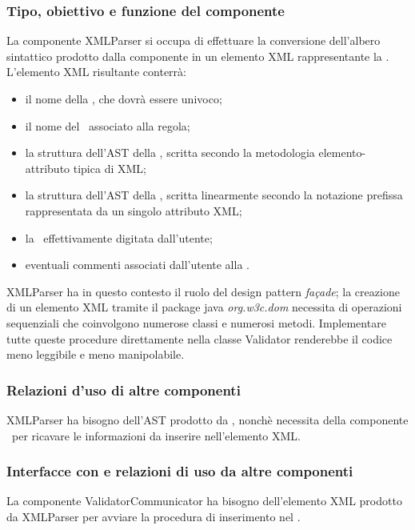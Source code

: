 \documentclass[11pt,titlepage,a4paper]{report}
\begin{document}
\subsubsection{Tipo, obiettivo e funzione del componente}
La componente XMLParser si occupa di effettuare la conversione dell'albero sintattico prodotto dalla componente \brp in un elemento XML rappresentante la \br. L'elemento XML risultante conterr\`a:
\begin{itemize}
 \item il nome della \br, che dovr\`a essere univoco;
 \item il nome del \bo\ associato alla regola;
 \item la struttura dell'AST della \br, scritta secondo la metodologia elemento-attributo tipica di XML;
 \item la struttura dell'AST della \br, scritta linearmente secondo la notazione prefissa rappresentata da un singolo attributo XML;
 \item la \br\ effettivamente digitata dall'utente;
 \item eventuali commenti associati dall'utente alla \br.
\end{itemize}
XMLParser ha in questo contesto il ruolo del design pattern \textit{fa\c{c}ade}; la creazione di un elemento XML tramite il package java \textit{org.w3c.dom} necessita di operazioni sequenziali che coinvolgono numerose classi e numerosi metodi. Implementare tutte queste procedure direttamente nella classe Validator renderebbe il codice meno leggibile e meno manipolabile.
\subsubsection{Relazioni d'uso di altre componenti}
XMLParser ha bisogno dell'AST prodotto da \brp, nonch\`e necessita della componente \br\ per ricavare le informazioni da inserire nell'elemento XML.
\subsubsection{Interfacce con e relazioni di uso da altre componenti}
La componente ValidatorCommunicator ha bisogno dell'elemento XML prodotto da XMLParser per avviare la procedura di inserimento nel \re.
\end{document}
